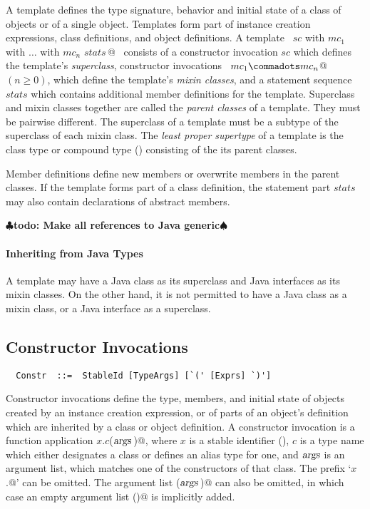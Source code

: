 \documentclass[a4paper,12pt,twoside,titlepage]{book}
\newcommand{\args}{\mbox{\sl args}}
\renewcommand{\todo}[1]{{$\clubsuit$\bf todo: #1$\spadesuit$}}
\begin{document}
A template defines the type signature, behavior and initial state of a
class of objects or of a single object. Templates form part of
instance creation expressions, class definitions, and object
definitions.  A template
~\lstinline@$sc$ with $mc_1$ with $\ldots$ with $mc_n$ {$stats\,$}@~
consists of a constructor invocation $sc$
which defines the template's {\em superclass}, constructor invocations
~\lstinline@$mc_1 \commadots mc_n$@~ $(n \geq 0)$, which define the
template's {\em mixin classes}, and a statement sequence $stats$ which
contains additional member definitions for the template.  Superclass
and mixin classes together are called the {\em parent classes} of a
template.  They must be pairwise different.  The superclass of a
template must be a subtype of the superclass of each mixin class.  The
{\em least proper supertype} of a template is the class type or
compound type () consisting of the its parent
classes.

Member definitions define new members or overwrite members in the
parent classes.  If the template forms part of a class definition,
the statement part $stats$ may also contain declarations of abstract members.

\todo{Make all references to Java generic}

\paragraph{Inheriting from Java Types} A template may have a Java class as
its superclass and Java interfaces as its mixin classes. On the other
hand, it is not permitted to have a Java class as a mixin class, or a
Java interface as a superclass.

\subsection{Constructor Invocations}
\label{sec:constr-invoke}
\syntax\begin{lstlisting}
  Constr  ::=  StableId [TypeArgs] [`(' [Exprs] `)']  
\end{lstlisting}

Constructor invocations define the type, members, and initial state of
objects created by an instance creation expression, or of parts of an
object's definition which are inherited by a class or object
definition. A constructor invocation is a function application
\lstinline@$x$.$c$($\args\,$)@, where $x$ is a stable identifier
(), $c$ is a type name which either
designates a class or defines an alias type for one, and $\args$
is an argument list, which matches one of the constructors of that
class. The prefix `\lstinline@$x$.@' can be omitted. 
The argument list \lstinline@($\args\,$)@ can also be omitted, in which case an
empty argument list \lstinline@()@ is implicitly added.
\end{document}
